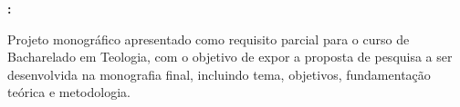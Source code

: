 \newpage

\begin{center}
    \textbf{\MakeUppercase{\imprimirautor}}
    \vskip 5.5cm

    \textbf{\MakeUppercase{\imprimirtitulo}:} \subtema

    \vskip 5.5cm
\end{center}
    \begin{flushright}
        \begin{minipage}{0.55\textwidth}
            Projeto monográfico apresentado como requisito parcial para o curso de Bacharelado em Teologia, com o objetivo de expor a proposta de pesquisa a ser desenvolvida na monografia final, incluindo tema, objetivos, fundamentação teórica e metodologia.
        \end{minipage}
    \end{flushright}
    \vskip 3.0cm
\begin{center}
    \vfill
    \imprimirlocal \\
    \imprimirdata
\end{center}